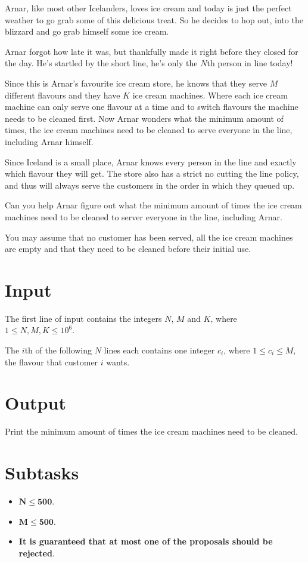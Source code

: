 Arnar, like most other Icelanders, loves ice cream and today is just the perfect
weather to go grab some of this delicious treat. So he decides to hop out, into
the blizzard and go grab himself some ice cream.

Arnar forgot how late it was, but thankfully made it right before they closed
for the day. He's startled by the short line, he's only the $N$th person in
line today!

Since this is Arnar's favourite ice cream store, he knows that they serve $M$
different flavours and they have $K$ ice cream machines.
Where each ice cream machine can only serve one flavour at a time and to switch
flavours the machine needs to be cleaned first.
Now Arnar wonders what the minimum amount of times, the ice cream machines
need to be cleaned to serve everyone in the line, including Arnar himself.

Since Iceland is a small place, Arnar knows every person in the line and exactly
which flavour they will get.
The store also has a strict no cutting the line policy, and thus will always serve
the customers in the order in which they queued up.

Can you help Arnar figure out what the minimum amount of times the ice cream
machines need to be cleaned to server everyone in the line, including Arnar.

You may assume that no customer has been served, all the ice cream machines
are empty and that they need to be cleaned before their initial use.

\section*{Input}
The first line of input contains the integers $N$, $M$ and $K$, where $1 \leq
N, M, K \leq 10^6$.

The $i$th of the following $N$ lines each contains one integer $c_i$,
where $1 \leq c_i \leq M$, the flavour that customer $i$ wants.

\section*{Output}
Print the minimum amount of times the ice cream machines need to be cleaned.

\section*{Subtasks}
\begin{itemize}
    \item $\mathbf{N} \mathbf{\leq} \mathbf{500}$.
    \item $\mathbf{M} \mathbf{\leq} \mathbf{500}$.
    \item \textbf{It is guaranteed that at most one of the proposals should be
    rejected}.
\end{itemize}

